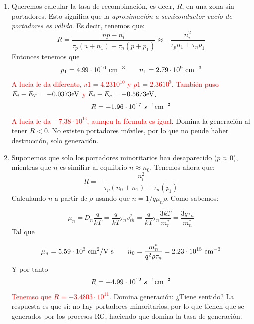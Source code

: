 \begin{texercise}
	\begin{enumerate}[label=\alph*)]
		\item Queremos calcular la tasa de recombinación, es decir, $R$, en una zona sin portadores. Esto significa que la \textit{aproximación a  semiconductor vacío de portadores es válido}. Es decir, tenemos que:
		\begin{equation}
			R = \frac{np-n_i}{\tau_p (n+n_1)+\tau_n (p+p_1)} \approx -\frac{n_i^2}{\tau_p n_1 + \tau_n p_1}
		\end{equation}
		Entonces tenemos que 
		\begin{equation}
			p_1 = 4.99\cdot 10^{10} \ \text{cm}^{-3} \qquad n_1= 2.79\cdot 10^{9} \ \text{cm}^{-3}
		\end{equation}
		\textcolor{red}{A lucia le da diferente, $n1=4.23 10^10$ y $p1=2.36 10^9$. También puso $E_i-E_T=-0.0373 \text{eV}$ y $E_i-E_c=-0.5673\text{eV}$}.
		\begin{equation}
			R = -1.96\cdot 10^{17} \ s^{-1}\text{cm}^{-3}
		\end{equation}
		\textcolor{red}{A lucia le da $-7.38\cdot 10^{16}$, aunqeu la fórmula es igual}. Domina la generación al tener $R<0$. No existen portadores móviles, por lo que no peude haber destrucción, solo generación.
		\item Suponemos que solo los portadores minoritarios han desaparecido ($p\approx 0$), mientras que $n$ es similiar al equlibrio $n\approx n_0$. Tenemos ahora que:
		\begin{equation}
			R = - \frac{n_i^2}{\tau_p(n_0+n_1)+\tau_n(p_1)}
		\end{equation}
		Calculando $n$ a partir de $\rho$ usando que $n = 1/q\mu_n\rho$. Como sabemos:

		\begin{equation}
			\mu_n = D_n  \frac{q}{kT} = \frac{q}{kT}  \tau_n {v_{th}^2} =  \frac{q}{kT}  \tau_n \frac{3kT}{m_n^*} = \frac{3q\tau_n}{ m_n^*} 
		\end{equation}
		Tal que 

		\begin{equation}
			\mu_n=5.59 \cdot 10^3  \ \text{cm}^2 /  \text{V s}  \qquad n_0 = \frac{m_n^*}{q^2\rho \tau_n} = 2.23 \cdot 10^{15} \ \text{cm}^{-3}
		\end{equation}
		Y por tanto
		\begin{equation}
			R = -4.99 \cdot 10^{12} \ s^{-1}\text{cm}^{-3}
		\end{equation}
		\textcolor{red}{Tenemso que $R=-3.4803\cdot 10^{11}$}. Domina generación: ¿Tiene sentido? La respuesta es que sí: no hay portadores minoritarios, por lo que tienen que se generados por los procesos RG, haciendo que domina la tasa de generación. 
	\end{enumerate}	

\end{texercise}


